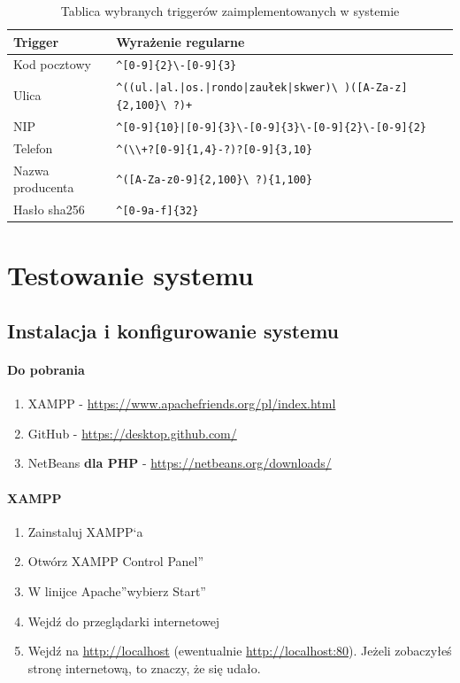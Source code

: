 \documentclass[a4paper, 12pt]{article}
\begin{document}
\begin{table}[H]
	\caption[Tablica wybranych triggerów]{Tablica wybranych triggerów zaimplementowanych w systemie}
	\label{tab:tabelaTrigerów}
		\hskip-1cm\begin{tabular}{ l l }
			Trigger & Wyrażenie regularne \\ \hline
			Kod pocztowy & \verb=^[0-9]{2}\-[0-9]{3}= \\ \hline
			Ulica & \verb=^((ul.|al.|os.|rondo|zaułek|skwer)\ )([A-Za-z]{2,100}\ ?)+= \\ \hline
			NIP & \verb=^[0-9]{10}|[0-9]{3}\-[0-9]{3}\-[0-9]{2}\-[0-9]{2}= \\ \hline
			Telefon & \verb=^(\\+?[0-9]{1,4}-?)?[0-9]{3,10}= \\ \hline
			Nazwa producenta & \verb=^([A-Za-z0-9]{2,100}\ ?){1,100}= \\ \hline
			Hasło sha256 & \verb=^[0-9a-f]{32}= \\ \hline
		\end{tabular}
\end{table}


\section{Testowanie systemu}
\subsection{Instalacja i konfigurowanie systemu}
\paragraph{Do pobrania}
\begin{enumerate}
	\item XAMPP - \url{https://www.apachefriends.org/pl/index.html}
	\item GitHub - \url{https://desktop.github.com/}
	\item NetBeans \textbf{dla PHP} - {\url{https://netbeans.org/downloads/}}
\end{enumerate}
\paragraph{XAMPP}
\begin{enumerate}
	\item Zainstaluj XAMPP`a
	\item Otwórz \quotedblbase XAMPP Control Panel\textquotedblright
	\item W linijce \quotedblbase Apache\textquotedblright wybierz \quotedblbase Start\textquotedblright
	\item Wejdź do przeglądarki internetowej
	\item Wejdź na \url{http://localhost} (ewentualnie \url{http://localhost:80}). Jeżeli zobaczyłeś stronę internetową, to znaczy, że się udało.
\end{enumerate}
\end{document}
